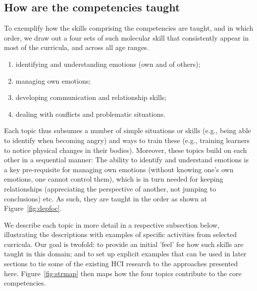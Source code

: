 \documentclass[prodmode,acmtochi]{acmsmall}
\begin{document}
\subsection{How are the competencies taught}
To exemplify how the skills comprising the competencies are taught, and in which order, we draw out a four sets of such molecular skill that consistently appear in most of the curricula, and across all age ranges. 


\begin{enumerate}
        \item identifying and understanding emotions (own and of others);
        \item managing own emotions;
        \item developing communication and relationship skills;
        \item dealing with conflicts and problematic situations.
\end{enumerate}
 
Each topic thus subsumes a number of simple situations or skills (e.g., being able to identify when becoming angry) and ways to train these (e.g., training learners to notice physical changes in their bodies).
Moreover, these topics build on each other in a sequential manner: The ability to identify and understand emotions is a key pre-requisite for managing own emotions (without knowing one's own emotions, one cannot control them), which is in turn needed for keeping relationships (appreciating the perspective of another, not jumping to conclusions) etc. As such, they are taught in the order as shown at Figure~\ref{fig:depfoc}. 
%

We describe each topic in more detail in a respective subsection below, illustrating the descriptions with examples of specific activities from selected curricula. Our goal is twofold: to provide an initial 'feel' for how such skills are taught in this domain; and to set up explicit examples that can be used in later sections to tie some of the existing HCI research to the approaches presented here. Figure~\ref{fig:strmap} then maps how the four topics contribute to the core competencies. 
\end{document}
